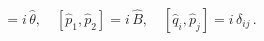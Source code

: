 \begin{equation}
[{\hat q}_1,{\hat q}_2]=i\,{\hat \theta}, \quad
[{\hat p}_1,{\hat p}_2]=i\,{\hat B}, \quad
[{\hat q}_i,{\hat p}_j]=i\,\delta_{ij}\, .
\label{[qp]}
\end{equation}

